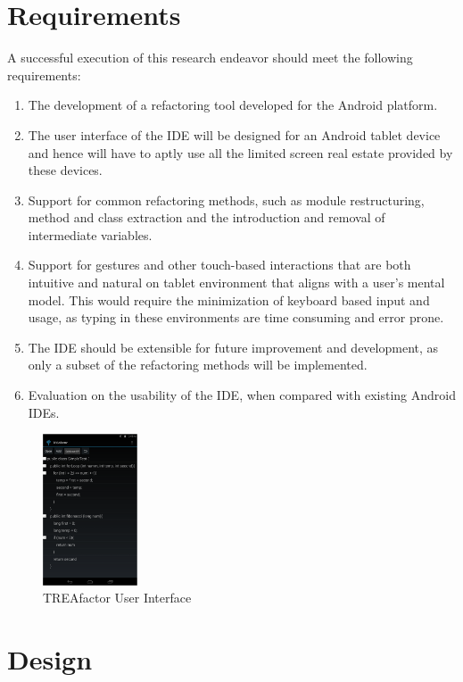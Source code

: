 \documentclass[10.5pt,twocolumn]{article}
\begin{document}
\section{Requirements}
A successful execution of this research endeavor should meet the following requirements:
\begin{enumerate}
\item The development of a refactoring tool developed for the Android platform.
\item The user interface of the IDE will be designed for an Android tablet device and hence will have to aptly use all the limited screen real estate provided by these devices.
\item Support for common refactoring methods, such as module restructuring, method and class extraction and the introduction and removal of intermediate variables.
\item Support for gestures and other touch-based interactions that are both intuitive and natural on tablet environment that aligns with a user’s mental model. This would require the minimization of keyboard based input and usage, as typing in these environments are time consuming and error prone.
\item The IDE should be extensible for future improvement and development, as only a subset of the refactoring methods will be implemented.
\item Evaluation on the usability of the IDE, when compared with existing Android IDEs.
\end{enumerate}

\begin{figure}[h]
    \centering
    \includegraphics[width=0.25\textwidth]{screenshot}
    \caption{TREAfactor User Interface}
    \label{fig:tf1}
\end{figure}
\section{Design}
\end{document}
